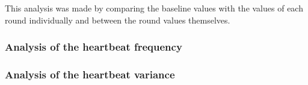 This analysis was made by comparing the baseline values with the values of each round individually and between the round values themselves.

\subsubsection{Analysis of the heartbeat frequency}



%
%
\subsubsection{Analysis of the heartbeat variance}
%
